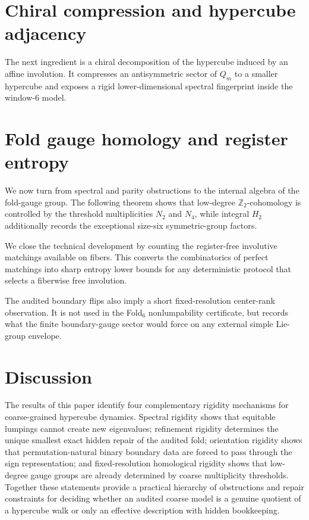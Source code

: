 \documentclass[12pt,a4paper]{article}
\theoremstyle{plain}
\theoremstyle{definition}
\numberwithin{equation}{section}
\newcommand{\ZZ}{\mathbb{Z}}
\begin{document}
\section{Chiral compression and hypercube adjacency}\label{sec:chiral}
The next ingredient is a chiral decomposition of the hypercube induced by an affine involution. It compresses an antisymmetric sector of \(Q_m\) to a smaller hypercube and exposes a rigid lower-dimensional spectral fingerprint inside the window-\(6\) model.


\section{Fold gauge homology and register entropy}\label{sec:gauge-homology}
We now turn from spectral and parity obstructions to the internal algebra of the fold-gauge group. The following theorem shows that low-degree \(\ZZ_2\)-cohomology is controlled by the threshold multiplicities \(N_2\) and \(N_4\), while integral \(H_2\) additionally records the exceptional size-six symmetric-group factors.


We close the technical development by counting the register-free involutive matchings available on fibers. This converts the combinatorics of perfect matchings into sharp entropy lower bounds for any deterministic protocol that selects a fiberwise free involution.


The audited boundary flips also imply a short fixed-resolution center-rank observation.  It is not used in the Fold\(_6\) nonlumpability certificate, but records what the finite boundary-gauge sector would force on any external simple Lie-group envelope.


\section{Discussion}\label{sec:discussion}
The results of this paper identify four complementary rigidity mechanisms for coarse-grained hypercube dynamics. Spectral rigidity shows that equitable lumpings cannot create new eigenvalues; refinement rigidity determines the unique smallest exact hidden repair of the audited fold; orientation rigidity shows that permutation-natural binary boundary data are forced to pass through the sign representation; and fixed-resolution homological rigidity shows that low-degree gauge groups are already determined by coarse multiplicity thresholds. Together these statements provide a practical hierarchy of obstructions and repair constraints for deciding whether an audited coarse model is a genuine quotient of a hypercube walk or only an effective description with hidden bookkeeping.
\end{document}
